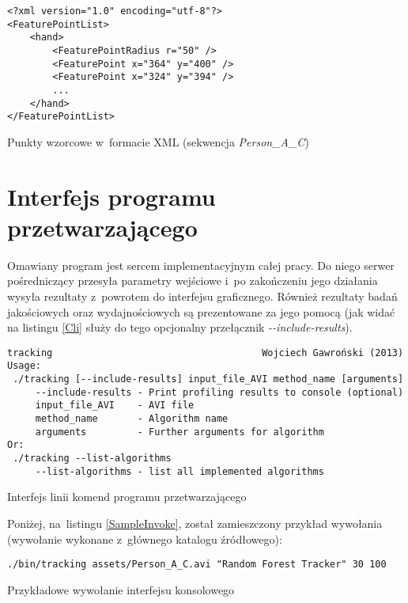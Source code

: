       \begin{sample}[ht]
        \begin{verbatim}
<?xml version="1.0" encoding="utf-8"?>
<FeaturePointList>
    <hand>
        <FeaturePointRadius r="50" />
        <FeaturePoint x="364" y="400" />
        <FeaturePoint x="324" y="394" />
        ...
    </hand>
</FeaturePointList>
        \end{verbatim}
        \caption{Punkty wzorcowe w~formacie XML (sekwencja \textit{Person\_A\_C})}
        \label{KeypointsXml}
      \end{sample}

  \section{Interfejs programu przetwarzającego}\label{Section_CLI}

    Omawiany program jest sercem implementacyjnym całej pracy. Do niego serwer pośredniczący przesyła parametry wejściowe i~po zakończeniu jego działania wysyła rezultaty z~powrotem do interfejsu graficznego. Również rezultaty badań jakościowych oraz wydajnościowych są prezentowane za jego pomocą (jak widać na listingu \ref{Cli} służy do tego opcjonalny przełącznik \textit{-{}-include-results}).

    \newpage
      \begin{sample}[ht]
        \begin{verbatim}
tracking                                     Wojciech Gawroński (2013)
Usage:
 ./tracking [--include-results] input_file_AVI method_name [arguments]
     --include-results - Print profiling results to console (optional)
     input_file_AVI    - AVI file
     method_name       - Algorithm name
     arguments         - Further arguments for algorithm
Or:
 ./tracking --list-algorithms
     --list-algorithms - list all implemented algorithms
        \end{verbatim}
        \caption{Interfejs linii komend programu przetwarzającego}
        \label{Cli}
      \end{sample}

    Poniżej, na~listingu \ref{SampleInvoke}, został zamieszczony przykład wywołania (wywołanie wykonane z~głównego katalogu źródłowego):

      \begin{sample}[ht]
        \begin{verbatim}
./bin/tracking assets/Person_A_C.avi "Random Forest Tracker" 30 100
        \end{verbatim}
        \caption{Przykładowe wywołanie interfejsu konsolowego}
        \label{SampleInvoke}
      \end{sample}

